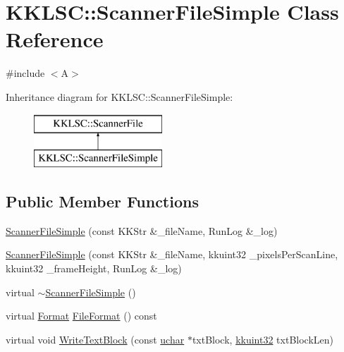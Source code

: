\hypertarget{class_k_k_l_s_c_1_1_scanner_file_simple}{}\section{K\+K\+L\+SC\+:\+:Scanner\+File\+Simple Class Reference}
\label{class_k_k_l_s_c_1_1_scanner_file_simple}


{\ttfamily \#include $<$A$>$}

Inheritance diagram for K\+K\+L\+SC\+:\+:Scanner\+File\+Simple\+:\begin{figure}[H]
\begin{center}
\leavevmode
\includegraphics[height=2.000000cm]{class_k_k_l_s_c_1_1_scanner_file_simple}
\end{center}
\end{figure}
\subsection*{Public Member Functions}
\begin{DoxyCompactItemize}
\item 
\hyperlink{class_k_k_l_s_c_1_1_scanner_file_simple_a1eb46cc7a4d1124f6a6965f7be424d12}{Scanner\+File\+Simple} (const K\+K\+Str \&\+\_\+file\+Name, Run\+Log \&\+\_\+log)
\item 
\hyperlink{class_k_k_l_s_c_1_1_scanner_file_simple_a51e7c9eb072354911c5e54eaf8916d9d}{Scanner\+File\+Simple} (const K\+K\+Str \&\+\_\+file\+Name, kkuint32 \+\_\+pixels\+Per\+Scan\+Line, kkuint32 \+\_\+frame\+Height, Run\+Log \&\+\_\+log)
\item 
virtual \hyperlink{class_k_k_l_s_c_1_1_scanner_file_simple_a0df983f0737edf29102d7a20926a3b96}{$\sim$\+Scanner\+File\+Simple} ()
\item 
virtual \hyperlink{class_k_k_l_s_c_1_1_scanner_file_a9eb976c9d084a94db71a5e8d1fadb903}{Format} \hyperlink{class_k_k_l_s_c_1_1_scanner_file_simple_a523a6500f6eea0cdef956fabe205b7e0}{File\+Format} () const 
\item 
virtual void \hyperlink{class_k_k_l_s_c_1_1_scanner_file_simple_a9c2f22a6c5e6f12d681cbaca0f01ce21}{Write\+Text\+Block} (const \hyperlink{namespace_k_k_b_ace9969169bf514f9ee6185186949cdf7}{uchar} $\ast$txt\+Block, \hyperlink{namespace_k_k_b_af8d832f05c54994a1cce25bd5743e19a}{kkuint32} txt\+Block\+Len)
\end{DoxyCompactItemize}
